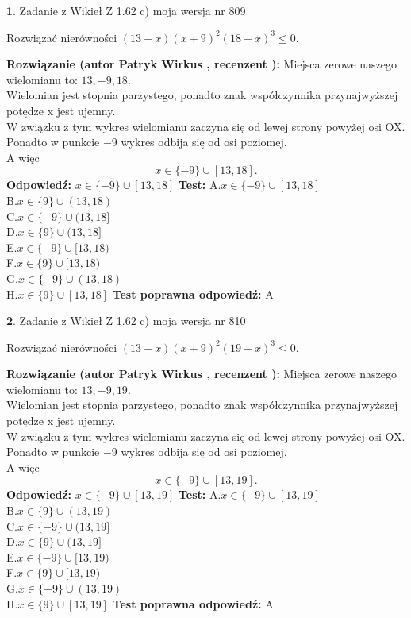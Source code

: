\documentclass[12pt, a4paper]{article}
\theoremstyle{definition} %
\newtheorem{zad}{}
\newcommand{\zadStart}[1]{\begin{zad}#1\newline}
\newcommand{\zadStop}{\end{zad}}
\newcommand{\rozwStart}[2]{\noindent \textbf{Rozwiązanie (autor #1 , recenzent #2): }\newline}
\newcommand{\rozwStop}{\newline}
\newcommand{\odpStart}{\noindent \textbf{Odpowiedź:}\newline}
\newcommand{\odpStop}{\newline}
\newcommand{\testStart}{\noindent \textbf{Test:}\newline}
\newcommand{\testStop}{\newline}
\newcommand{\kluczStart}{\noindent \textbf{Test poprawna odpowiedź:}\newline}
\newcommand{\kluczStop}{\newline}
\begin{document}
\zadStart{Zadanie z Wikieł Z 1.62 c) moja wersja nr 809}

Rozwiązać nierówności $(13-x)(x+9)^{2}(18-x)^{3}\le0$.
\zadStop
\rozwStart{Patryk Wirkus}{}
Miejsca zerowe naszego wielomianu to: $13, -9, 18$.\\
Wielomian jest stopnia parzystego, ponadto znak współczynnika przy\linebreak najwyższej potędze x jest ujemny.\\ W związku z tym wykres wielomianu zaczyna się od lewej strony powyżej osi OX.\\
Ponadto w punkcie $-9$ wykres odbija się od osi poziomej.\\
A więc $$x \in \{-9\} \cup [13,18].$$
\rozwStop
\odpStart
$x \in \{-9\} \cup [13,18]$
\odpStop
\testStart
A.$x \in \{-9\} \cup [13,18]$\\
B.$x \in \{9\} \cup (13,18)$\\
C.$x \in \{-9\} \cup (13,18]$\\
D.$x \in \{9\} \cup (13,18]$\\
E.$x \in \{-9\} \cup [13,18)$\\
F.$x \in \{9\} \cup [13,18)$\\
G.$x \in \{-9\} \cup (13,18)$\\
H.$x \in \{9\} \cup [13,18]$
\testStop
\kluczStart
A
\kluczStop



\zadStart{Zadanie z Wikieł Z 1.62 c) moja wersja nr 810}

Rozwiązać nierówności $(13-x)(x+9)^{2}(19-x)^{3}\le0$.
\zadStop
\rozwStart{Patryk Wirkus}{}
Miejsca zerowe naszego wielomianu to: $13, -9, 19$.\\
Wielomian jest stopnia parzystego, ponadto znak współczynnika przy\linebreak najwyższej potędze x jest ujemny.\\ W związku z tym wykres wielomianu zaczyna się od lewej strony powyżej osi OX.\\
Ponadto w punkcie $-9$ wykres odbija się od osi poziomej.\\
A więc $$x \in \{-9\} \cup [13,19].$$
\rozwStop
\odpStart
$x \in \{-9\} \cup [13,19]$
\odpStop
\testStart
A.$x \in \{-9\} \cup [13,19]$\\
B.$x \in \{9\} \cup (13,19)$\\
C.$x \in \{-9\} \cup (13,19]$\\
D.$x \in \{9\} \cup (13,19]$\\
E.$x \in \{-9\} \cup [13,19)$\\
F.$x \in \{9\} \cup [13,19)$\\
G.$x \in \{-9\} \cup (13,19)$\\
H.$x \in \{9\} \cup [13,19]$
\testStop
\kluczStart
A
\kluczStop
\end{document}
